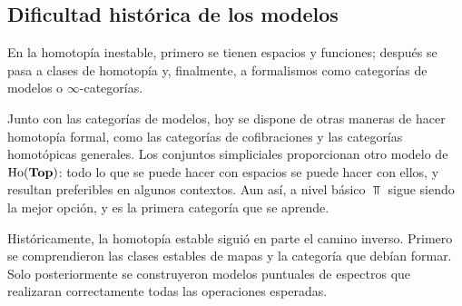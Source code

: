\subsection{Dificultad histórica de los modelos}

En la homotopía inestable, primero se tienen espacios y funciones; después se pasa a clases de homotopía y, finalmente, a formalismos como categorías de modelos o \(\infty\)-categorías.

Junto con las categorías de modelos, hoy se dispone de otras maneras de hacer homotopía formal, como las categorías de cofibraciones y las categorías homotópicas generales. Los conjuntos simpliciales proporcionan otro modelo de \(\operatorname{Ho}(\mathbf{Top})\): todo lo que se puede hacer con espacios se puede hacer con ellos, y resultan preferibles en algunos contextos. Aun así, a nivel básico \(\Top\) sigue siendo la mejor opción, y es la primera categoría que se aprende.

Históricamente, la homotopía estable siguió en parte el camino inverso. Primero se comprendieron las clases estables de mapas y la categoría que debían formar. Solo posteriormente se construyeron modelos puntuales de espectros que realizaran correctamente todas las operaciones esperadas.

